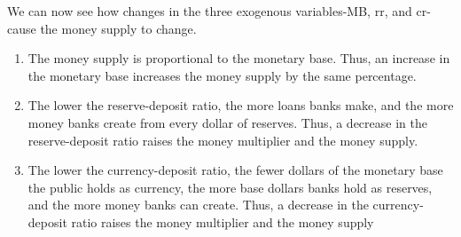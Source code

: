 \documentclass[10pt]{article}
\begin{document}
We can now see how changes in the three exogenous variables-MB, rr, and cr-cause the money supply to change.

\begin{enumerate}
  \item The money supply is proportional to the monetary base. Thus, an increase in the monetary base increases the money supply by the same percentage.
  \item The lower the reserve-deposit ratio, the more loans banks make, and the more money banks create from every dollar of reserves. Thus, a decrease in the reserve-deposit ratio raises the money multiplier and the money supply.
  \item The lower the currency-deposit ratio, the fewer dollars of the monetary base the public holds as currency, the more base dollars banks hold as reserves, and the more money banks can create. Thus, a decrease in the currency-deposit ratio raises the money multiplier and the money supply
\end{enumerate}
\end{document}
